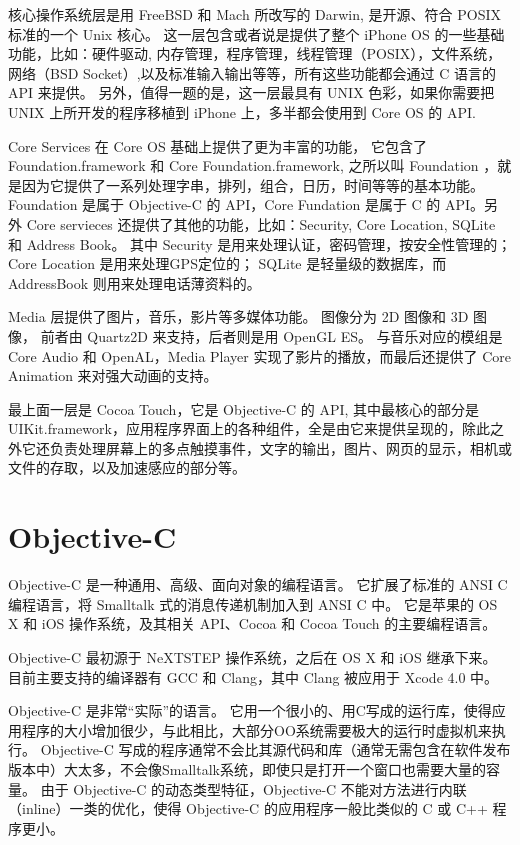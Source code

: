 核心操作系统层是用 FreeBSD 和 Mach 所改写的 Darwin, 是开源、符合 POSIX 标准的一个 Unix 核心。
这一层包含或者说是提供了整个 iPhone OS 的一些基础功能，比如：硬件驱动, 内存管理，程序管理，线程管理（POSIX），文件系统，网络（BSD Socket）,以及标准输入输出等等，所有这些功能都会通过 C 语言的 API 来提供。
另外，值得一题的是，这一层最具有 UNIX 色彩，如果你需要把 UNIX 上所开发的程序移植到 iPhone 上，多半都会使用到 Core OS 的 API.

Core Services 在 Core OS 基础上提供了更为丰富的功能， 它包含了 Foundation.framework 和 Core Foundation.framework, 之所以叫 Foundation ，就是因为它提供了一系列处理字串，排列，组合，日历，时间等等的基本功能。
Foundation 是属于 Objective-C 的 API，Core Fundation 是属于 C 的 API。另外 Core servieces 还提供了其他的功能，比如：Security, Core Location, SQLite 和 Address Book。
其中 Security 是用来处理认证，密码管理，按安全性管理的；
Core Location 是用来处理GPS定位的；
SQLite 是轻量级的数据库，而 AddressBook 则用来处理电话薄资料的。

Media 层提供了图片，音乐，影片等多媒体功能。
图像分为 2D 图像和 3D 图像， 前者由 Quartz2D 来支持，后者则是用 OpenGL ES。
与音乐对应的模组是 Core Audio 和 OpenAL，Media Player 实现了影片的播放，而最后还提供了 Core Animation 来对强大动画的支持。

最上面一层是 Cocoa Touch，它是 Objective-C 的 API, 其中最核心的部分是 UIKit.framework，应用程序界面上的各种组件，全是由它来提供呈现的，除此之外它还负责处理屏幕上的多点触摸事件，文字的输出，图片、网页的显示，相机或文件的存取，以及加速感应的部分等。

\section{Objective-C}

Objective-C 是一种通用、高级、面向对象的编程语言。
它扩展了标准的 ANSI C 编程语言，将 Smalltalk 式的消息传递机制加入到 ANSI C 中。
它是苹果的 OS X 和 iOS 操作系统，及其相关 API、Cocoa 和 Cocoa Touch 的主要编程语言。

Objective-C 最初源于 NeXTSTEP 操作系统，之后在 OS X 和 iOS 继承下来。
目前主要支持的编译器有 GCC 和 Clang，其中 Clang 被应用于 Xcode 4.0 中。

Objective-C 是非常“实际”的语言。
它用一个很小的、用C写成的运行库，使得应用程序的大小增加很少，与此相比，大部分OO系统需要极大的运行时虚拟机来执行。
Objective-C 写成的程序通常不会比其源代码和库（通常无需包含在软件发布版本中）大太多，不会像Smalltalk系统，即使只是打开一个窗口也需要大量的容量。
由于 Objective-C 的动态类型特征，Objective-C 不能对方法进行内联（inline）一类的优化，使得 Objective-C 的应用程序一般比类似的 C 或 C++ 程序更小。

